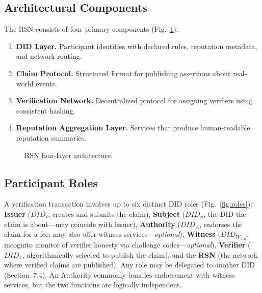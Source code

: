 \documentclass[11pt,a4paper,twocolumn]{article}
\begin{document}
\subsection{Architectural Components}

The RSN consists of four primary components (Fig.~\ref{fig:architecture}):
\begin{enumerate}[nosep]
\item \textbf{DID Layer.} Participant identities with declared rules, reputation metadata, and network routing.
\item \textbf{Claim Protocol.} Structured format for publishing assertions about real-world events.
\item \textbf{Verification Network.} Decentralized protocol for assigning verifiers using consistent hashing.
\item \textbf{Reputation Aggregation Layer.} Services that produce human-readable reputation summaries.
\end{enumerate}

\begin{figure}[ht]
\centering
{}
\caption{RSN four-layer architecture.}
\label{fig:architecture}
\end{figure}

\subsection{Participant Roles}

A verification transaction involves up to six distinct DID roles (Fig.~\ref{fig:roles}): \textbf{Issuer} ($DID_I$, creates and submits the claim), \textbf{Subject} ($DID_S$, the DID the claim is about---may coincide with Issuer), \textbf{Authority} ($DID_A$, endorses the claim for a fee; may also offer witness services---\emph{optional}), \textbf{Witness} ($DID_{W_{1..n}}$, incognito monitor of verifier honesty via challenge codes---\emph{optional}), \textbf{Verifier} ($DID_V$, algorithmically selected to publish the claim), and the \textbf{RSN} (the network where verified claims are published). Any role may be delegated to another DID (Section~7.4). An Authority commonly bundles endorsement with witness services, but the two functions are logically independent.
\end{document}
